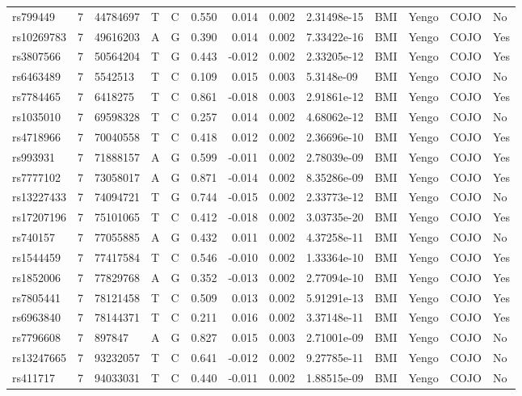 \documentclass[11pt,twoside]{bristolthesis}
\begin{document}
\begin{longtable}[t]{lrlllrrrlllll}
rs799449 & 7 & 44784697 & T & C & 0.550 & 0.014 & 0.002 & 2.31498e-15 & BMI & Yengo & COJO & No\\
\addlinespace
rs10269783 & 7 & 49616203 & A & G & 0.390 & 0.014 & 0.002 & 7.33422e-16 & BMI & Yengo & COJO & Yes\\
rs3807566 & 7 & 50564204 & T & G & 0.443 & -0.012 & 0.002 & 2.33205e-12 & BMI & Yengo & COJO & Yes\\
rs6463489 & 7 & 5542513 & T & C & 0.109 & 0.015 & 0.003 & 5.3148e-09 & BMI & Yengo & COJO & No\\
rs7784465 & 7 & 6418275 & T & C & 0.861 & -0.018 & 0.003 & 2.91861e-12 & BMI & Yengo & COJO & Yes\\
rs1035010 & 7 & 69598328 & T & C & 0.257 & 0.014 & 0.002 & 4.68062e-12 & BMI & Yengo & COJO & No\\
\addlinespace
rs4718966 & 7 & 70040558 & T & C & 0.418 & 0.012 & 0.002 & 2.36696e-10 & BMI & Yengo & COJO & Yes\\
rs993931 & 7 & 71888157 & A & G & 0.599 & -0.011 & 0.002 & 2.78039e-09 & BMI & Yengo & COJO & Yes\\
rs7777102 & 7 & 73058017 & A & G & 0.871 & -0.014 & 0.002 & 8.35286e-09 & BMI & Yengo & COJO & Yes\\
rs13227433 & 7 & 74094721 & T & G & 0.744 & -0.015 & 0.002 & 2.33773e-12 & BMI & Yengo & COJO & No\\
rs17207196 & 7 & 75101065 & T & C & 0.412 & -0.018 & 0.002 & 3.03735e-20 & BMI & Yengo & COJO & Yes\\
\addlinespace
rs740157 & 7 & 77055885 & A & G & 0.432 & 0.011 & 0.002 & 4.37258e-11 & BMI & Yengo & COJO & No\\
rs1544459 & 7 & 77417584 & T & C & 0.546 & -0.010 & 0.002 & 1.33364e-10 & BMI & Yengo & COJO & Yes\\
rs1852006 & 7 & 77829768 & A & G & 0.352 & -0.013 & 0.002 & 2.77094e-10 & BMI & Yengo & COJO & Yes\\
rs7805441 & 7 & 78121458 & T & C & 0.509 & 0.013 & 0.002 & 5.91291e-13 & BMI & Yengo & COJO & Yes\\
rs6963840 & 7 & 78144371 & T & C & 0.211 & 0.016 & 0.002 & 3.37148e-11 & BMI & Yengo & COJO & Yes\\
\addlinespace
rs7796608 & 7 & 897847 & A & G & 0.827 & 0.015 & 0.003 & 2.71001e-09 & BMI & Yengo & COJO & No\\
rs13247665 & 7 & 93232057 & T & C & 0.641 & -0.012 & 0.002 & 9.27785e-11 & BMI & Yengo & COJO & No\\
rs411717 & 7 & 94033031 & T & C & 0.440 & -0.011 & 0.002 & 1.88515e-09 & BMI & Yengo & COJO & No\\

\end{longtable}
\end{document}
